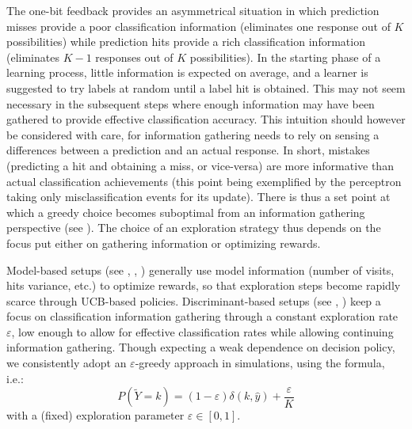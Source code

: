 \documentclass[preprint,12pt,authoryear]{elsarticle}
\begin{document}
 The one-bit feedback provides an asymmetrical situation in which prediction misses provide a poor classification information (eliminates one response out of $K$ possibilities) while prediction hits provide a rich classification information (eliminates $K-1$ responses out of $K$ possibilities). 
 In the starting phase of a learning process, little information is expected on average, and a learner is suggested to try labels at random until a label hit is obtained. This may not seem necessary in the subsequent steps where enough information may have been gathered to provide effective classification accuracy. 
 This intuition should however be considered with care, for information gathering needs to rely on sensing a differences between a prediction and an actual response. {\color{blue} In short, mistakes (predicting a hit and obtaining a miss, or vice-versa) are  more informative than actual classification achievements (this point being exemplified by the perceptron taking only misclassification events for its update). There is thus a set point at which a greedy choice becomes suboptimal from an information gathering perspective (see \cite{kakade2008efficient}).} The choice of an exploration strategy thus depends on the focus put either on gathering information or optimizing rewards. 
 
 Model-based setups (see \cite{lai1985asymptotically}, \cite{auer2003nonstochastic}, \cite{crammer2013multiclass}) generally use model information (number of visits, hits variance, etc.) to optimize rewards, so that exploration steps become rapidly scarce through UCB-based policies. 
 Discriminant-based setups (see \cite{kakade2008efficient}, \cite{zhong2015esann}) keep a focus on classification information gathering through  
 a constant exploration rate $\varepsilon$, low enough to allow for effective classification rates while allowing continuing information gathering.
 Though expecting a weak dependence on decision policy, we consistently adopt an $\varepsilon$-greedy approach in simulations, using the \cite{kakade2008efficient} formula, i.e.:
 $$P(\tilde{Y}=k) = (1-\varepsilon) \delta(k,\hat{y}) + \frac{\varepsilon}{K}$$ with a (fixed) exploration parameter $\varepsilon \in [0,1]$.
\end{document}
